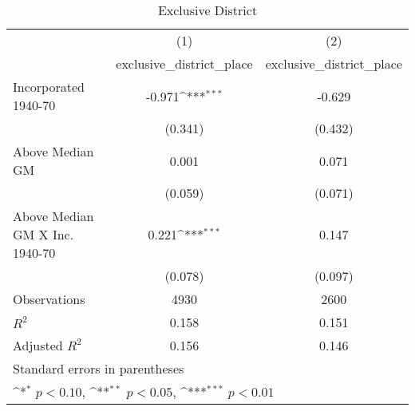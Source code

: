 \begin{table}[htbp]\centering
\def\sym#1{\ifmmode^{#1}\else\(^{#1}\)\fi}
\caption{Exclusive District}
\begin{tabular}{l*{2}{c}}
\hline\hline
                    &\multicolumn{1}{c}{(1)}&\multicolumn{1}{c}{(2)}\\
                    &\multicolumn{1}{c}{exclusive\_district\_place}&\multicolumn{1}{c}{exclusive\_district\_place}\\
\hline
Incorporated 1940-70&      -0.971\sym{***}&      -0.629         \\
                    &     (0.341)         &     (0.432)         \\
[1em]
Above Median GM     &       0.001         &       0.071         \\
                    &     (0.059)         &     (0.071)         \\
[1em]
Above Median GM X Inc. 1940-70&       0.221\sym{***}&       0.147         \\
                    &     (0.078)         &     (0.097)         \\
\hline
Observations        &        4930         &        2600         \\
\(R^{2}\)           &       0.158         &       0.151         \\
Adjusted \(R^{2}\)  &       0.156         &       0.146         \\
\hline\hline
\multicolumn{3}{l}{\footnotesize Standard errors in parentheses}\\
\multicolumn{3}{l}{\footnotesize \sym{*} \(p<0.10\), \sym{**} \(p<0.05\), \sym{***} \(p<0.01\)}\\
\end{tabular}
\end{table}
